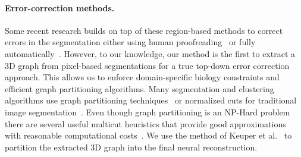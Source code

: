 \paragraph{Error-correction methods.}
Some recent research builds on top of these region-based methods to correct errors in the segmentation either using human proofreading~\cite{mojo2,haehn2014design,haehn2017guided} or fully automatically~\cite{rolnick2017morphological,error_correction_using_CNN}.
However, to our knowledge, our method is the first to extract a 3D graph from pixel-based segmentations for a true top-down error correction approach. This allows us to enforce domain-specific biology constraints and efficient graph partitioning algorithms. Many segmentation and clustering algorithms use graph partitioning techniques~\cite{andres2012globally} or normalized cuts for traditional image segmentation~\cite{kappes2016higher,shi2000normalized,tatiraju2008image}.
Even though graph partitioning is an NP-Hard problem~\cite{demaine2006correlation} there are several useful multicut heuristics that provide good approximations with reasonable computational costs~\cite{horvnakova2017analysis}. We use the method of Keuper et al.~\cite{keuper2015efficient} to partition the extracted 3D graph into the final neural reconstruction.
